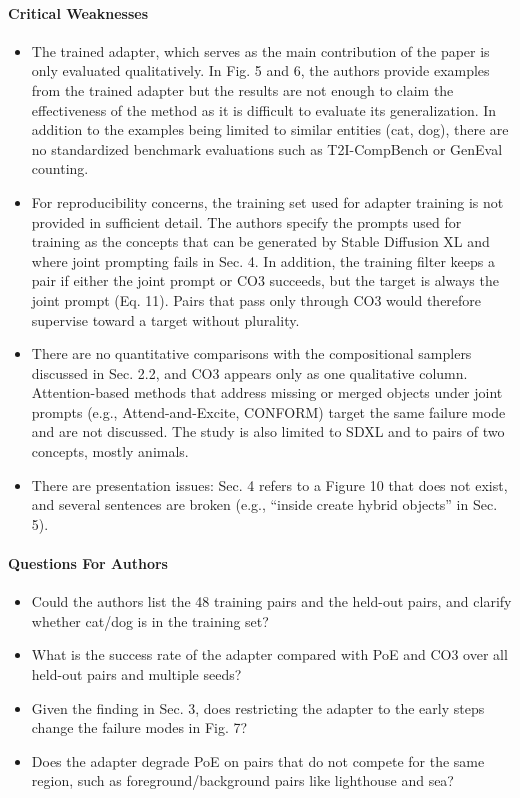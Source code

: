 {\begin{tcolorbox}[breakable,colback=red!3,colframe=red!45!black,title={The review by UHz6, as posted on OpenReview}]
\paragraph{Critical Weaknesses}
\begin{itemize}
\item The trained adapter, which serves as the main contribution of the paper is only evaluated qualitatively. In Fig. 5 and 6, the authors provide examples from the trained adapter but the results are not enough to claim the effectiveness of the method as it is difficult to evaluate its generalization. In addition to the examples being limited to similar entities (cat, dog), there are no standardized benchmark evaluations such as T2I-CompBench or GenEval counting.
\item For reproducibility concerns, the training set used for adapter training is not provided in sufficient detail. The authors specify the prompts used for training as the concepts that can be generated by Stable Diffusion XL and where joint prompting fails in Sec. 4. In addition, the training filter keeps a pair if either the joint prompt or CO3 succeeds, but the target is always the joint prompt (Eq. 11). Pairs that pass only through CO3 would therefore supervise toward a target without plurality.
\item There are no quantitative comparisons with the compositional samplers discussed in Sec. 2.2, and CO3 appears only as one qualitative column. Attention-based methods that address missing or merged objects under joint prompts (e.g., Attend-and-Excite, CONFORM) target the same failure mode and are not discussed. The study is also limited to SDXL and to pairs of two concepts, mostly animals.
\item There are presentation issues: Sec. 4 refers to a Figure 10 that does not exist, and several sentences are broken (e.g., ``inside create hybrid objects'' in Sec. 5).
\end{itemize}
\paragraph{Questions For Authors}
\begin{itemize}
\item Could the authors list the 48 training pairs and the held-out pairs, and clarify whether cat/dog is in the training set?
\item What is the success rate of the adapter compared with PoE and CO3 over all held-out pairs and multiple seeds?
\item Given the finding in Sec. 3, does restricting the adapter to the early steps change the failure modes in Fig. 7?
\item Does the adapter degrade PoE on pairs that do not compete for the same region, such as foreground/background pairs like lighthouse and sea?
\end{itemize}

\end{tcolorbox}}
